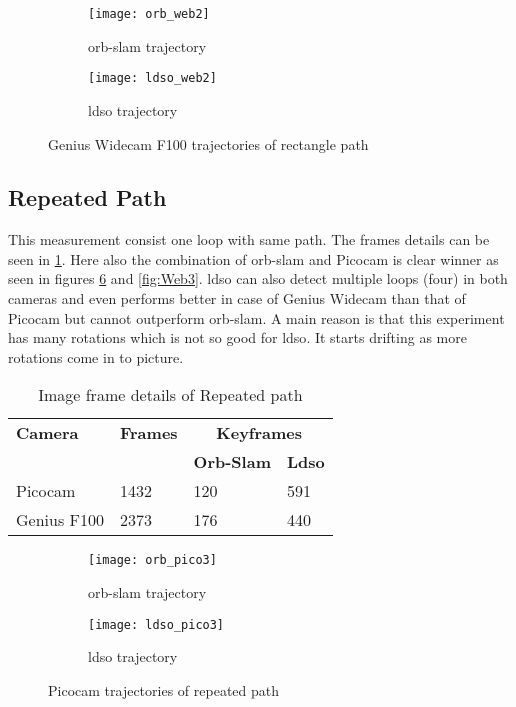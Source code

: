 \begin{figure}[H]
	\begin{subfigure}{.6\textwidth}
		\centering
		\texttt{[image: orb\_web2]}
		\caption{\acrshort{orb}-\acrshort{slam} trajectory}
		\label{fig:orb_web2}
	\end{subfigure}%
	\begin{subfigure}{.4\textwidth}
		\centering
		\texttt{[image: ldso\_web2]}
		\caption{\acrshort{ldso} trajectory}
		\label{fig:ldso_web2}
	\end{subfigure}
	\caption{Genius Widecam F100 trajectories of rectangle path}
	\label{fig:Web2}
\end{figure}

\subsection{Repeated Path}
This measurement consist one loop with same path. The frames details can be seen in \ref{table:repeated}. Here also the combination of \acrshort{orb}-\acrshort{slam} and Picocam is clear winner as seen in figures \ref{fig:Pico3} and \ref{fig:Web3}. \acrshort{ldso} can also detect multiple loops (four) in both cameras and even performs better in case of Genius Widecam than that of Picocam but cannot outperform \acrshort{orb}-\acrshort{slam}. A main reason is that this experiment has many rotations which is not so good for \acrshort{ldso}. It starts drifting as more rotations come in to picture.\\
\begin{table}[H]
	\centering
	\renewcommand{\arraystretch}{1.5}
	\begin{tabular}{ l| l| l |l }
		\textbf{Camera} & \textbf{Frames} & \multicolumn{2}{c}{\textbf{Keyframes}}  \\    
		&      & \textbf{Orb-Slam}  & \textbf{Ldso}  \\
		\hline
		Picocam & 1432 &  120  & 591 \\ 
		\hline
		Genius F100 & 2373 &  176  & 440 \\ 
	\end{tabular}
	\caption{Image frame details of Repeated path}
	\label{table:repeated}
\end{table}
\begin{figure}[H]
	\begin{subfigure}{.5\textwidth}
		\centering
		\texttt{[image: orb\_pico3]}
		\caption{\acrshort{orb}-\acrshort{slam} trajectory}
		\label{fig:orb_pico3}
	\end{subfigure}
	\begin{subfigure}{.5\textwidth}
		\centering
		\texttt{[image: ldso\_pico3]}
		\caption{\acrshort{ldso} trajectory}
		\label{fig:ldso_pico3}
	\end{subfigure}
	\caption{Picocam trajectories of repeated path}
	\label{fig:Pico3}
\end{figure}
